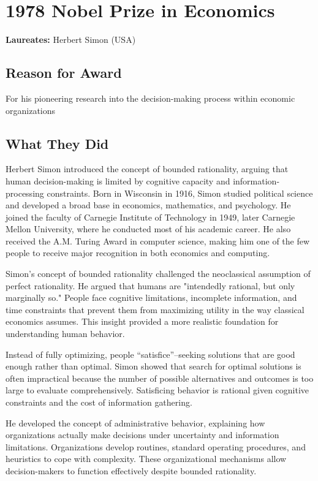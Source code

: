 \chapter{1978 Nobel Prize in Economics}
\textbf{Laureates: }Herbert Simon (USA)

\section*{Reason for Award}
For his pioneering research into the decision-making process within economic
organizations

\section{What They Did}
Herbert Simon introduced the concept of bounded rationality, arguing that human
decision-making is limited by cognitive capacity and information-processing
constraints. Born in Wisconsin in 1916, Simon studied political science and
developed a broad base in economics, mathematics, and psychology. He joined the
faculty of Carnegie Institute of Technology in 1949, later Carnegie Mellon
University, where he conducted most of his academic career. He also received
the A.M. Turing Award in computer science, making him one of the few people to
receive major recognition in both economics and computing.

Simon's concept of bounded rationality challenged the neoclassical assumption
of perfect rationality. He argued that humans are "intendedly rational, but
only marginally so." People face cognitive limitations, incomplete information,
and time constraints that prevent them from maximizing utility in the way
classical economics assumes. This insight provided a more realistic foundation
for understanding human behavior.

Instead of fully optimizing, people ``satisfice''--seeking solutions that are good
enough rather than optimal. Simon showed that search for optimal solutions
is often impractical because the number of possible alternatives and outcomes
is too large to evaluate comprehensively. Satisficing behavior is rational
given cognitive constraints and the cost of information gathering.

He developed the concept of administrative behavior, explaining how
organizations actually make decisions under uncertainty and information
limitations. Organizations develop routines, standard operating procedures,
and heuristics to cope with complexity. These organizational mechanisms
allow decision-makers to function effectively despite bounded rationality.

